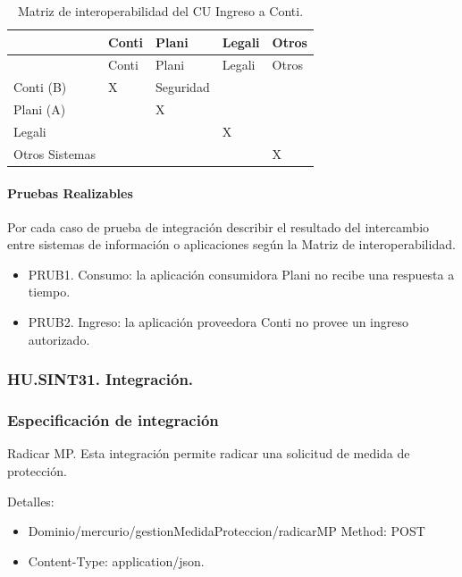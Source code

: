 \documentclass[
  paper=a4,
  ,captions=tableheading
]{scrartcl}
\providecommand{\tightlist}{%
  \setlength{\itemsep}{0pt}\setlength{\parskip}{0pt}}
\begin{document}
\begin{longtable}[]{@{}lllll@{}}
\caption{Matriz de interoperabilidad del CU Ingreso a
Conti.}\tabularnewline
\toprule\noalign{}
& Conti & Plani & Legali & Otros \\
\midrule\noalign{}
\endfirsthead
\toprule\noalign{}
& Conti & Plani & Legali & Otros \\
\midrule\noalign{}
\endhead
\bottomrule\noalign{}
\endlastfoot
Conti (B) & X & Seguridad & & \\
Plani (A) & & X & & \\
Legali & & & X & \\
Otros Sistemas & & & & X \\
\end{longtable}

\paragraph{Pruebas Realizables}\label{sec:pruebas-realizables}

Por cada caso de prueba de integración describir el resultado del
intercambio entre sistemas de información o aplicaciones según la Matriz
de interoperabilidad.

\begin{itemize}
\tightlist
\item
  PRUB1. Consumo: la aplicación consumidora Plani no recibe una
  respuesta a tiempo.
\item
  PRUB2. Ingreso: la aplicación proveedora Conti no provee un ingreso
  autorizado.
\end{itemize}

\subsubsection{HU.SINT31.
Integración.}\label{sec:hu.sint31.-integraciuxf3n.}

\subsubsection{Especificación de
integración}\label{sec:especificaciuxf3n-de-integraciuxf3n-1}

Radicar MP. Esta integración permite radicar una solicitud de medida de
protección.

Detalles:

\begin{itemize}
\tightlist
\item
  Dominio/mercurio/gestionMedidaProteccion/radicarMP Method: POST
\item
  Content-Type: application/json.
\end{itemize}
\end{document}
